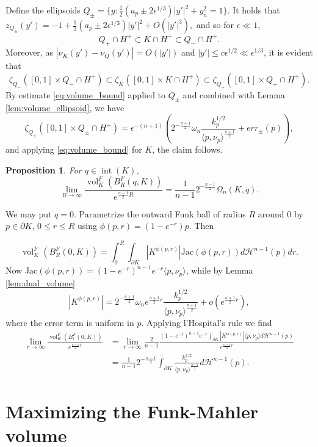 \documentclass[reqno,10pt]{amsart}
\newtheorem{Proposition}{Proposition}[section]
\DeclareMathOperator{\inter}{int}
\DeclareMathOperator{\vol}{vol}
\begin{document}
Define the ellipsoids $Q_{\pm} = \{y: \frac12 (a_p\pm 2\epsilon^{1/3})|y'|^2+y_n^2=1\}.$
It holds that $z_{Q_\pm}(y')=-1+\frac{1}{2}(a_p\pm 2\epsilon^{1/3})|y'|^2+O(|y'|^3),$
and so for $\epsilon\ll1$, $$Q_+\cap H^+\subset K\cap H^+\subset Q_-\cap H^+.$$
Moreover, as $|\nu_K(y')-\nu_Q(y')|=O(|y'|)$ and $|y'|\leq c \epsilon^{1/2}\ll\epsilon^{1/3}$, it is evident that $$\zeta_{Q_-}([0,1]\times Q_-\cap H^+)\subset  \zeta_{K}([0,1]\times K\cap H^+)\subset \zeta_{Q_+}([0,1]\times Q_+\cap H^+).$$
By estimate \eqref{eq:volume_bound} applied to $Q_\pm$ and combined with Lemma \ref{lem:volume_ellipsoid}, we have
$$ \zeta_{Q_\pm}([0,1]\times Q_\pm\cap H^+)=\epsilon^{-(n+1)}\left( 2^{-\frac{n+1}{2}} \omega_n \frac{k_p^{1/2}}{\langle p,\nu_p\rangle^{\frac{n+1}{2}}}+err_\pm(p)\right), $$
and applying \eqref{eq:volume_bound} for $K$, the claim follows. 

 
\endproof

\begin{Proposition}\label{prop:centro_affine}
	For $q\in \inter(K)$, $$\lim_{R\to \infty}\frac{\vol^F_K(B_R^F(q, K))}{e^{\frac{n-1}{2}R}}=\frac{1}{n-1}2^{-\frac{n-1}{2}} \Omega_n(K,q).$$
\end{Proposition}
\proof
We may put $q=0$. Parametrize the outward Funk ball of radius $R$ around $0$ by $p\in\partial K$, $0\leq r\leq R$ using $\phi(p,r)=(1-e^{-r})p$. Then

$$ \vol^F_K(B_R^F(0,K))=\int_0^R\int_{\partial K} |K^{\phi(p,r)}|\mathrm{Jac}(\phi(p,r))d\mathcal H^{n-1}(p)dr.$$  
Now $\mathrm{Jac}(\phi(p,r))=(1-e^{-r})^{n-1}e^{-r}\langle p, \nu_p\rangle$, while by Lemma \ref{lem:dual_volume} 
$$ |K^{\phi(p,r)}|= 2^{-\frac{n+1}{2}} \omega_n e^{\frac{n+1}{2}r} \frac{k_p^{1/2}}{\langle p,\nu_p\rangle^{\frac{n+1}{2}}}+o(e^{\frac{n+1}{2}r}),$$
where the error term is uniform in $p$. Applying l'Hospital's rule we find 
\begin{align*}\lim_{r\to \infty}\frac{\vol_K^F(B_r^F(0,K))}{e^{\frac{n-1}{2}r}}&=\lim_{r\to\infty}\frac{2}{n-1} \frac {(1-e^{-r})^{n-1}e^{-r}\int_{\partial K} |K^{\phi(p,r)}|\langle p, \nu_p\rangle  d\mathcal H^{n-1}(p)}{e^{\frac{n-1}{2}r}}
\\&=\frac{1}{n-1}2^{-\frac{n-1}{2}} \int_{\partial K}\frac{k_p^{1/2}}{\langle p,\nu_p\rangle^{\frac{n-1}{2}}}d\mathcal H^{n-1}(p).\end{align*}
\endproof

\section{Maximizing the Funk-Mahler volume}\label{sec:inequalities}
\end{document}
